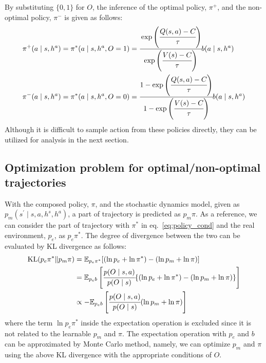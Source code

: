 \documentclass{bmcart}
\begin{document}
By substituting $\{0,1\}$ for $O$, the inference of the optimal policy, $\pi^+$, and the non-optimal policy, $\pi^-$ is given as follows:
\begin{align}
    \pi^+(a \mid s, h^a) &= \pi^*(a \mid s, h^a, O=1)
    = \cfrac{\exp\left( \cfrac{Q(s,a) - C}{\tau} \right)}{\exp\left( \cfrac{V(s) - C}{\tau} \right)} b(a \mid s, h^a)
    \label{eq:def_policy_opt} \\
    \pi^-(a \mid s, h^a) &= \pi^*(a \mid s, h^a, O=0)
    = \cfrac{1 - \exp\left( \cfrac{Q(s,a) - C}{\tau} \right)}{1 - \exp\left( \cfrac{V(s) - C}{\tau} \right)} b(a \mid s, h^a)
    \label{eq:def_policy_nopt}
\end{align}
Although it is difficult to sample action from these policies directly, they can be utilized for analysis in the next section.

\subsection{Optimization problem for optimal/non-optimal trajectories}

With the composed policy, $\pi$, and the stochastic dynamics model, given as $p_m(s^\prime \mid s, a, h^s, h^a)$, a part of trajectory is predicted as $p_m \pi$.
As a reference, we can consider the part of trajectory with $\pi^*$ in eq.~\eqref{eq:policy_cond} and the real environment, $p_e$, as $p_e \pi^*$.
The degree of divergence between the two can be evaluated by KL divergence as follows:
\begin{align}
    \mathrm{KL}(p_e \pi^* \| p_m \pi) &= \mathbb{E}_{p_e \pi^*} [(\ln p_e + \ln \pi^*) - (\ln p_m + \ln \pi)]
    \nonumber \\
    &= \mathbb{E}_{p_e b} \left [ \cfrac{p(O \mid s, a)}{p(O \mid s)} \{(\ln p_e + \ln \pi^*) - (\ln p_m + \ln \pi)\} \right ]
    \nonumber \\
    &\propto - \mathbb{E}_{p_e b} \left [ \cfrac{p(O \mid s, a)}{p(O \mid s)} (\ln p_m + \ln \pi) \right ]
    \label{eq:kl_traj_cond}
\end{align}
where the term $\ln p_e \pi^*$ inside the expectation operation is excluded since it is not related to the learnable $p_m$ and $\pi$.
The expectation operation with $p_e$ and $b$ can be approximated by Monte Carlo method, namely, we can optimize $p_m$ and $\pi$ using the above KL divergence with the appropriate conditions of $O$.
\end{document}
